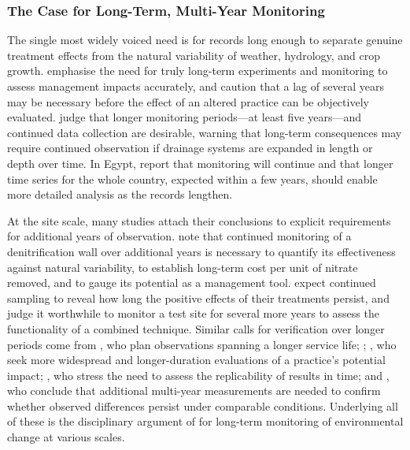 \subsubsection{The Case for Long-Term, Multi-Year Monitoring}

The single most widely voiced need is for records long enough to separate genuine treatment effects from the natural variability of weather, hydrology, and crop growth. \textcite{Clifford2023} emphasise the need for truly long-term experiments and monitoring to assess management impacts accurately, and \textcite{BUHLER1993} caution that a lag of several years may be necessary before the effect of an altered practice can be objectively evaluated. \textcite{Ali2013} judge that longer monitoring periods---at least five years---and continued data collection are desirable, warning that long-term consequences may require continued observation if drainage systems are expanded in length or depth over time. In Egypt, \textcite{Ali2001} report that monitoring will continue and that longer time series for the whole country, expected within a few years, should enable more detailed analysis as the records lengthen.

At the site scale, many studies attach their conclusions to explicit requirements for additional years of observation. \textcite{Jaynes2008} note that continued monitoring of a denitrification wall over additional years is necessary to quantify its effectiveness against natural variability, to establish long-term cost per unit of nitrate removed, and to gauge its potential as a management tool. \textcite{Dalhem2019} expect continued sampling to reveal how long the positive effects of their treatments persist, and \textcite{Osterholm2005} judge it worthwhile to monitor a test site for several more years to assess the functionality of a combined technique. Similar calls for verification over longer periods come from \textcite{ROLLIN1987}, who plan observations spanning a longer service life; \textcite{Wesström2015}; \textcite{Reinhart2020}, who seek more widespread and longer-duration evaluations of a practice's potential impact; \textcite{Rijal2012}, who stress the need to assess the replicability of results in time; and \textcite{GiménezValero2025}, who conclude that additional multi-year measurements are needed to confirm whether observed differences persist under comparable conditions. Underlying all of these is the disciplinary argument of \textcite{SPALING1995} for long-term monitoring of environmental change at various scales.


